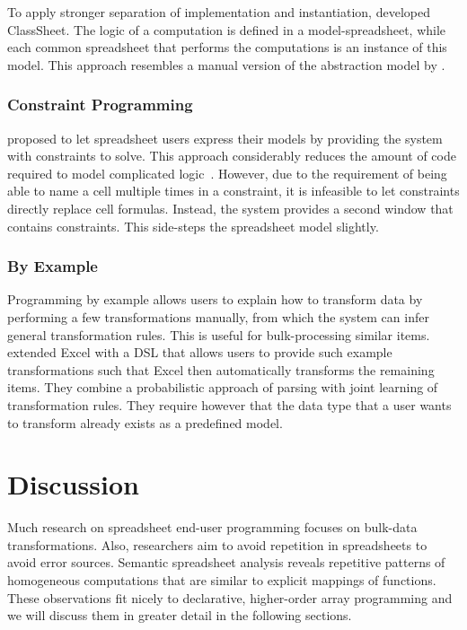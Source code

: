 \documentclass[a4paper]{article}
\begin{document}
To apply stronger separation of implementation and instantiation, \citet{6070409} developed ClassSheet. The logic of a computation is defined in a model-spreadsheet, while each common spreadsheet that performs the computations is an instance of this model. This approach resembles a manual version of the abstraction model by \citet{Isakowitz:1995:TLT:195705.195708}.

\subsubsection{Constraint Programming}

\citet{Stadelmann:1993:SBC:168642.168664} proposed to let spreadsheet users express their models by providing the system with constraints to solve. This approach considerably reduces the amount of code required to model complicated logic~\cite{Stadelmann:1993:SBC:168642.168664}. However, due to the requirement of being able to name a cell multiple times in a constraint, it is infeasible to let constraints directly replace cell formulas. Instead, the system provides a second window that contains constraints. This side-steps the spreadsheet model slightly.

\subsubsection{By Example}

Programming by example allows users to explain how to transform data by performing a few transformations manually, from which the system can infer general transformation rules. This is useful for bulk-processing similar items. \citet{Singh:2016:TSD:2837614.2837668} extended Excel with a DSL that allows users to provide such example transformations such that Excel then automatically transforms the remaining items. They combine a probabilistic approach of parsing with joint learning of transformation rules. They require however that the data type that a user wants to transform already exists as a predefined model.

\section{Discussion}
\label{sec:discussion}

Much research on spreadsheet end-user programming focuses on bulk-data transformations. Also, researchers aim to avoid repetition in spreadsheets to avoid error sources. Semantic spreadsheet analysis reveals repetitive patterns of homogeneous computations that are similar to explicit mappings of functions. These observations fit nicely to declarative, higher-order array programming and we will discuss them in greater detail in the following sections.
\end{document}

